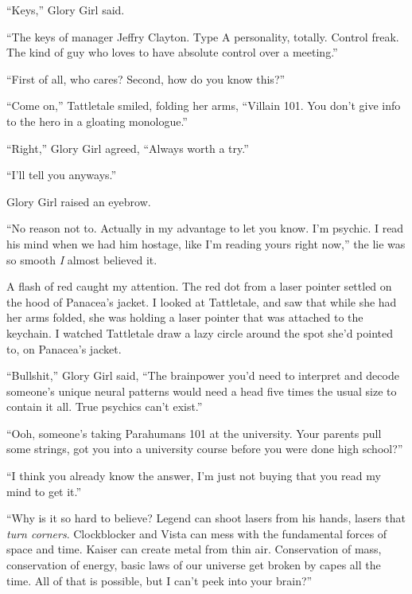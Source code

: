 ``Keys,'' Glory Girl said.



``The keys of manager Jeffry Clayton.  Type A personality, totally.  Control freak.  The kind of guy who loves to have absolute control over a meeting.''



``First of all, who cares?  Second, how do you know this?''



``Come on,'' Tattletale smiled, folding her arms, ``Villain 101.  You don't give info to the hero in a gloating monologue.''



``Right,'' Glory Girl agreed, ``Always worth a try.''



``I'll tell you anyways.''



Glory Girl raised an eyebrow.



``No reason not to.  Actually in my advantage to let you know.  I'm psychic.  I read his mind when we had him hostage, like I'm reading yours right now,'' the lie was so smooth \emph{I} almost believed it.



A flash of red caught my attention.  The red dot from a laser pointer settled on the hood of Panacea's jacket. I looked at Tattletale, and saw that while she had her arms folded, she was holding a laser pointer that was attached to the keychain.  I watched Tattletale draw a lazy circle around the spot she'd pointed to, on Panacea's jacket.



``Bullshit,'' Glory Girl said, ``The brainpower you'd need to interpret and decode someone's unique neural patterns would need a head five times the usual size to contain it all.  True psychics can't exist.''



``Ooh, someone's taking Parahumans 101 at the university.  Your parents pull some strings, got you into a university course before you were done high school?''



``I think you already know the answer, I'm just not buying that you read my mind to get it.''



``Why is it so hard to believe?  Legend can shoot lasers from his hands, lasers that \emph{turn corners}.  Clockblocker and Vista can mess with the fundamental forces of space and time.  Kaiser can create metal from thin air.  Conservation of mass, conservation of energy, basic laws of our universe get broken by capes all the time.  All of that is possible, but I can't peek into your brain?''



